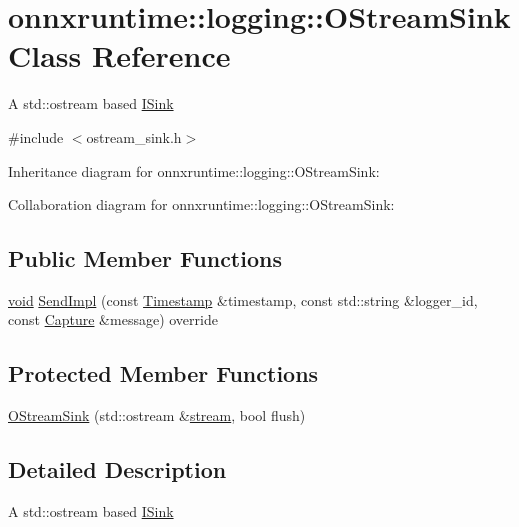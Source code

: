 \hypertarget{classonnxruntime_1_1logging_1_1OStreamSink}{}\section{onnxruntime\+:\+:logging\+:\+:O\+Stream\+Sink Class Reference}
\label{classonnxruntime_1_1logging_1_1OStreamSink}


A std\+::ostream based \mbox{\hyperlink{classonnxruntime_1_1logging_1_1ISink}{I\+Sink}}  




{\ttfamily \#include $<$ostream\+\_\+sink.\+h$>$}



Inheritance diagram for onnxruntime\+:\+:logging\+:\+:O\+Stream\+Sink\+:


Collaboration diagram for onnxruntime\+:\+:logging\+:\+:O\+Stream\+Sink\+:
\subsection*{Public Member Functions}
\begin{DoxyCompactItemize}
\item 
\mbox{\hyperlink{mlasi_8h_a88f941d423cb2a819b70a1358982b1a6}{void}} \mbox{\hyperlink{classonnxruntime_1_1logging_1_1OStreamSink_a456a79a87ca486aa94bc50421a3da1af}{Send\+Impl}} (const \mbox{\hyperlink{namespaceonnxruntime_1_1logging_ae7a2a84f622a028e2ad495a74289012d}{Timestamp}} \&timestamp, const std\+::string \&logger\+\_\+id, const \mbox{\hyperlink{classonnxruntime_1_1logging_1_1Capture}{Capture}} \&message) override
\end{DoxyCompactItemize}
\subsection*{Protected Member Functions}
\begin{DoxyCompactItemize}
\item 
\mbox{\hyperlink{classonnxruntime_1_1logging_1_1OStreamSink_a3c64f6806295288887efd79ccc4ec645}{O\+Stream\+Sink}} (std\+::ostream \&\mbox{\hyperlink{mkldnn_2nn_2pool_8cc_ad0f65d11dab10450bd6d5c5e9847a34b}{stream}}, bool flush)
\end{DoxyCompactItemize}


\subsection{Detailed Description}
A std\+::ostream based \mbox{\hyperlink{classonnxruntime_1_1logging_1_1ISink}{I\+Sink}} 

